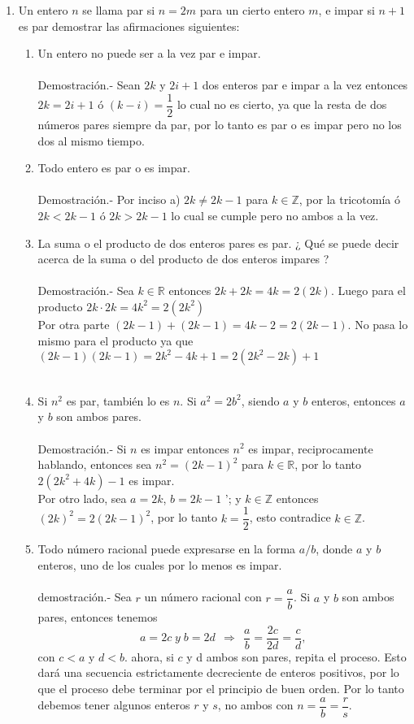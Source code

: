 \begin{enumerate}
\item Un entero $n$ se llama par si $n=2m$ para un cierto entero $m$, e impar si $n+1$ es par demostrar las afirmaciones siguientes:
\begin{enumerate}[\bfseries a)]
\item Un entero no puede ser a la vez par e impar.\\\\
Demostración.- \; Sean $2k$ y $2i+1$ dos enteros par e impar a la vez  entonces $2k=2i+1$ ó  $(k-i)=\dfrac{1}{2}$  lo cual no es cierto, ya que la resta de dos números pares siempre da par, por lo tanto es par o es impar pero no los dos al mismo tiempo.\\
\item Todo entero es par o es impar.\\\\
Demostración.- \; Por inciso a) \; $2k\neq 2k-1$ para $k\in \mathbb{Z}$, por la tricotomía ó $2k < 2k-1$ ó $2k > 2k-1$ lo cual se cumple pero no ambos a la vez.\\  
\item La suma o el producto de dos enteros pares es par. ¿ Qué se puede decir acerca de la suma o del producto de dos enteros impares ?\\\\
Demostración.- \; Sea $k\in \mathbb{R}$ entonces $2k+2k=4k=2(2k)$. Luego para el producto $2k\cdot 2k = 4k^2=2(2k^2)$\\
Por otra parte $(2k-1)+(2k-1)=4k-2=2(2k-1)$. No pasa lo mismo para el producto ya que  $(2k-1)(2k-1)=2k^2-4k+1=2(2k^2-2k)+1$\\\\
\item Si $n^2$ es par, también lo es $n$. Si $a^2=2b^2$, siendo $a$ y $b$ enteros, entonces $a$ y $b$ son ambos pares.\\\\
Demostración.- \;  Si $n$ es impar entonces $n^2$ es impar, reciprocamente hablando, entonces sea $n^2=(2k-1)^2$ para $k\in \mathbb{R}$, por lo tanto $2(2k^2+4k)-1$ es impar.\\
Por otro lado, sea $a=2k$, $b=2k-1$ '; y \; $k\in \mathbb{Z}$ entonces $(2k)^2=2(2k-1)^2$, por lo tanto $k=\dfrac{1}{2}$, esto contradice $k\in \mathbb{Z}$.\\
\item Todo número racional puede expresarse en la forma $a/b$, donde $a$ y $b$ enteros, uno de los cuales por lo menos es impar.\\\\
demostración.- \; Sea $r$ un número racional con $r=\dfrac{a}{b}$. Si $a$\; y \; $b$ son ambos pares, entonces tenemos $$a=2c \; y \; b=2d \,\; \Rightarrow \,\; \dfrac{a}{b}=\dfrac{2c}{2d}=\dfrac{c}{d},$$ con $c<a$ \; y \; $d<b$. ahora, si $c$ \; y \; d ambos son pares, repita el proceso. Esto dará una secuencia estrictamente decreciente de enteros positivos, por lo que el proceso debe terminar por el principio de buen orden. Por lo tanto debemos tener algunos enteros $r$ \; y \; $s$, no ambos con $n=\dfrac{a}{b}=\dfrac{r}{s}$.
\end{enumerate}


\end{enumerate}
